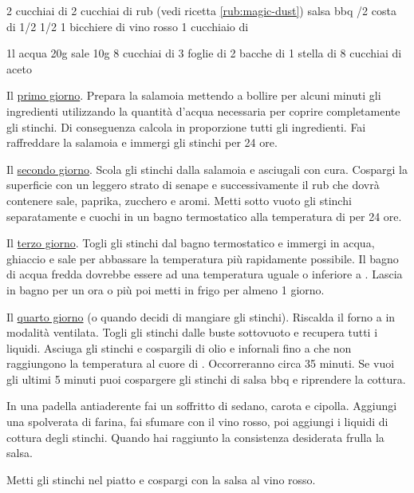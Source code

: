 \begin{ingreds}
	 
	2 cucchiai di 
	2 cucchiai di rub (vedi ricetta \ref{rub:magic-dust})
	salsa bbq
	/2 costa di 
	1/2 
	1/2 
	1 bicchiere di vino rosso
	1 cucchiaio di 

\columnbreak
	1l acqua
	20g sale
	10g 
	8 cucchiai di 
	3 foglie di 
	2 bacche di 
	1 stella di 
	8 cucchiai di aceto
\end{ingreds}

\begin{method}
Il \underline{primo giorno}. Prepara la salamoia mettendo a bollire per alcuni minuti gli ingredienti utilizzando la quantità d'acqua necessaria per coprire completamente gli stinchi. Di conseguenza calcola in proporzione tutti gli ingredienti. Fai raffreddare la salamoia e immergi gli stinchi per 24 ore.

Il \underline{secondo giorno}. Scola gli stinchi dalla salamoia e asciugali con cura. Cospargi la superficie con un leggero strato di senape e successivamente il rub che dovrà contenere sale, paprika, zucchero e aromi. Metti sotto vuoto gli stinchi separatamente e cuochi in un bagno termostatico alla temperatura di  per 24 ore.

Il \underline{terzo giorno}. Togli gli stinchi dal bagno termostatico e immergi in acqua, ghiaccio e sale per abbassare la temperatura più rapidamente possibile. Il bagno di acqua fredda dovrebbe essere ad una temperatura uguale o inferiore a . Lascia in bagno per un ora o più poi metti in frigo per almeno 1 giorno.

Il \underline{quarto giorno} (o quando decidi di mangiare gli stinchi). Riscalda il forno a  in modalità ventilata. Togli gli stinchi dalle buste sottovuoto e recupera tutti i liquidi. Asciuga gli stinchi e cospargili di olio e infornali fino a che non raggiungono la temperatura al cuore di . Occorreranno circa 35 minuti. Se vuoi gli ultimi 5 minuti puoi cospargere gli stinchi di salsa bbq e riprendere la cottura.

In una padella antiaderente fai un soffritto di sedano, carota e cipolla. Aggiungi una spolverata di farina, fai sfumare con il vino rosso, poi aggiungi i liquidi di cottura degli stinchi. Quando hai raggiunto la consistenza desiderata frulla la salsa.

Metti gli stinchi nel piatto e cospargi con la salsa al vino rosso.
\end{method}



